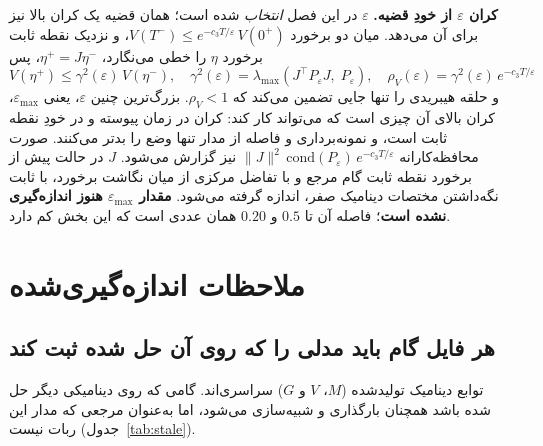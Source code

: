 \documentclass[10pt,twocolumn]{article}
\newcommand{\en}[1]{\lr{#1}}
\begin{document}
\textbf{کران $\varepsilon$ از خودِ قضیه.} $\varepsilon$ در این فصل \emph{انتخاب} شده است؛
همان قضیه یک کران بالا نیز برای آن می‌دهد. میان دو برخورد
$V(T^-)\le e^{-c_3T/\varepsilon}\,V(0^+)$، و نزدیک نقطه ثابت برخورد $\eta$ را خطی می‌نگارد،
$\eta^+=J\eta^-$، پس
\begin{equation}
V(\eta^+)\le\gamma^2(\varepsilon)\,V(\eta^-),\quad
\gamma^2(\varepsilon)=\lambda_{\max}\!\left(J^{\top}P_\varepsilon J,\;P_\varepsilon\right),\quad
\rho_V(\varepsilon)=\gamma^2(\varepsilon)\,e^{-c_3T/\varepsilon}
\label{eq:epsbound}
\end{equation}
و \en{RES-CLF} حلقه هیبریدی را تنها جایی تضمین می‌کند که $\rho_V<1$. بزرگ‌ترین چنین
$\varepsilon$، یعنی $\varepsilon_{\max}$، کران بالای آن چیزی است که می‌تواند کار کند: کران در
زمان پیوسته و در خودِ نقطه ثابت است، و نمونه‌برداری و فاصله از مدار تنها وضع را بدتر می‌کنند.
صورت محافظه‌کارانه $\|J\|^2\,\mathrm{cond}(P_\varepsilon)\,e^{-c_3T/\varepsilon}$ نیز گزارش
می‌شود. $J$ در حالت پیش از برخورد نقطه ثابت گام مرجع و با تفاضل مرکزی از میان نگاشت برخورد،
با ثابت نگه‌داشتن مختصات دینامیک صفر، اندازه گرفته می‌شود. \textbf{مقدار $\varepsilon_{\max}$
هنوز اندازه‌گیری نشده است}؛ فاصله آن تا $0.5$ و $0.20$ همان عددی است که این بخش کم دارد.

\section{ملاحظات اندازه‌گیری‌شده}
\subsection{هر فایل گام باید مدلی را که روی آن حل شده ثبت کند}
توابع دینامیک تولیدشده ($M$، $V$ و $G$) سراسری‌اند. گامی که روی دینامیکی دیگر حل شده باشد
همچنان بارگذاری و شبیه‌سازی می‌شود، اما به‌عنوان مرجعی که مدار این ربات نیست
(جدول~\ref{tab:stale}).
\end{document}
